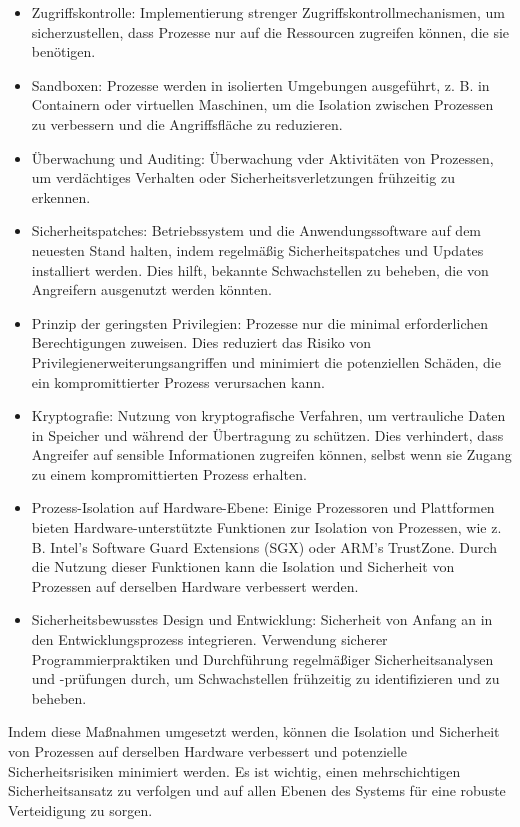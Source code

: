 \begin{itemize}
\item Zugriffskontrolle: Implementierung strenger Zugriffskontrollmechanismen, um sicherzustellen, dass Prozesse nur auf die Ressourcen zugreifen können, die sie benötigen.
\item Sandboxen: Prozesse werden in isolierten Umgebungen ausgeführt, z. B. in Containern oder virtuellen Maschinen, um die Isolation zwischen Prozessen zu verbessern und die Angriffsfläche zu reduzieren.
\item Überwachung und Auditing: Überwachung vder Aktivitäten von Prozessen, um verdächtiges Verhalten oder Sicherheitsverletzungen frühzeitig zu erkennen.
\item Sicherheitspatches: Betriebssystem und die Anwendungssoftware auf dem neuesten Stand halten, indem regelmäßig Sicherheitspatches und Updates installiert werden. Dies hilft, bekannte Schwachstellen zu beheben, die von Angreifern ausgenutzt werden könnten.
\item Prinzip der geringsten Privilegien: Prozesse nur die minimal erforderlichen Berechtigungen zuweisen. Dies reduziert das Risiko von Privilegienerweiterungsangriffen und minimiert die potenziellen Schäden, die ein kompromittierter Prozess verursachen kann.
\item Kryptografie: Nutzung von kryptografische Verfahren, um vertrauliche Daten in Speicher und während der Übertragung zu schützen. Dies verhindert, dass Angreifer auf sensible Informationen zugreifen können, selbst wenn sie Zugang zu einem kompromittierten Prozess erhalten.
\item Prozess-Isolation auf Hardware-Ebene: Einige Prozessoren und Plattformen bieten Hardware-unterstützte Funktionen zur Isolation von Prozessen, wie z. B. Intel's Software Guard Extensions (SGX) oder ARM's TrustZone. Durch die Nutzung dieser Funktionen kann die Isolation und Sicherheit von Prozessen auf derselben Hardware verbessert werden.
\item Sicherheitsbewusstes Design und Entwicklung: Sicherheit von Anfang an in den Entwicklungsprozess integrieren. Verwendung sicherer Programmierpraktiken und Durchführung regelmäßiger Sicherheitsanalysen und -prüfungen durch, um Schwachstellen frühzeitig zu identifizieren und zu beheben.
\end{itemize}
Indem diese Maßnahmen umgesetzt werden, können die Isolation und Sicherheit von Prozessen auf derselben Hardware verbessert und potenzielle Sicherheitsrisiken minimiert werden. Es ist wichtig, einen mehrschichtigen Sicherheitsansatz zu verfolgen und auf allen Ebenen des Systems für eine robuste Verteidigung zu sorgen.

